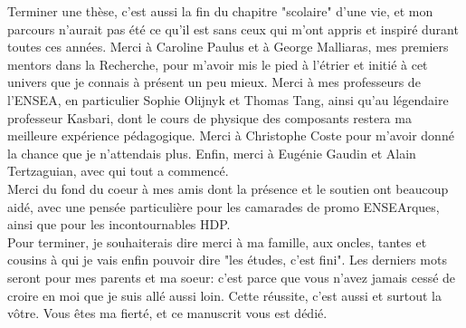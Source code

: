 {Terminer une thèse, c'est aussi la fin du chapitre "scolaire" d'une vie, et mon parcours n'aurait pas été ce qu'il est sans ceux qui m'ont appris et inspiré durant toutes ces années. Merci à Caroline Paulus et à George Malliaras, mes premiers mentors dans la Recherche, pour m'avoir mis le pied à l'étrier et initié à cet univers que je connais à présent un peu mieux. Merci à mes professeurs de l'ENSEA, en particulier Sophie Olijnyk et Thomas Tang, ainsi qu'au légendaire professeur Kasbari, dont le cours de physique des composants restera ma meilleure expérience pédagogique. Merci à Christophe Coste pour m'avoir donné la chance que je n'attendais plus. Enfin, merci à Eugénie Gaudin et Alain Tertzaguian, avec qui tout a commencé. \\

Merci du fond du coeur à mes amis dont la présence et le soutien ont beaucoup aidé, avec une pensée particulière pour les camarades de promo ENSEArques, ainsi que pour les incontournables HDP. \\

Pour terminer, je souhaiterais dire merci à ma famille, aux oncles, tantes et cousins à qui je vais enfin pouvoir dire "les études, c'est fini". Les derniers mots seront pour mes parents et ma soeur: c'est parce que vous n'avez jamais cessé de croire en moi que je suis allé aussi loin. Cette réussite, c'est aussi et surtout la vôtre. Vous êtes ma fierté, et ce manuscrit vous est dédié.
}




